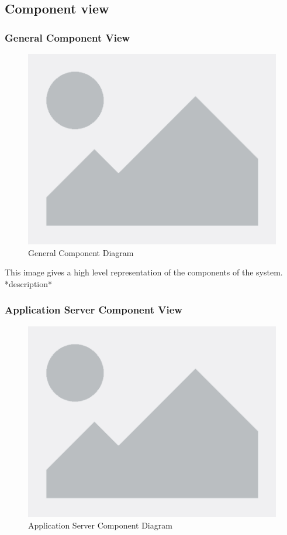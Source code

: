 \documentclass[table, 12pt]{article}
\begin{document}
\subsection{Component view}
\subsubsection*{General Component View}
\begin{center}
    \begin{figure}[H]
        \includegraphics[scale=0.45, center]{assets/placeholder.png}
        \caption{General Component Diagram}
        \label{fig: general_component_view}
    \end{figure}
\end{center}

This image gives a high level representation of the components of the system.
*description*

\subsubsection*{Application Server Component View}
\begin{center}
    \begin{figure}[H]
        \includegraphics[scale=0.45, center]{assets/placeholder.png}
        \caption{Application Server Component Diagram}
        \label{fig: application_server_component_view}
    \end{figure}
\end{center}
\end{document}
